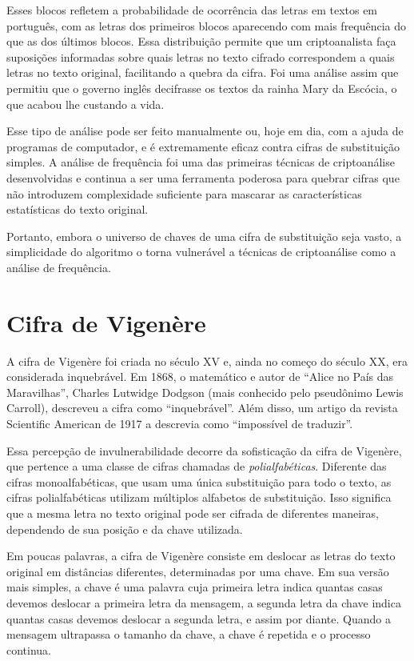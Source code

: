 Esses blocos refletem a probabilidade de ocorrência das letras em textos em português, com as letras dos primeiros blocos aparecendo com mais frequência do que as dos últimos blocos.
Essa distribuição permite que um criptoanalista faça suposições informadas sobre quais letras no texto cifrado correspondem a quais letras no texto original, facilitando a quebra da cifra.
Foi uma análise assim que permitiu que o governo inglês decifrasse os textos da rainha Mary da Escócia, o que acabou lhe custando a vida.

Esse tipo de análise pode ser feito manualmente ou, hoje em dia, com a ajuda de programas de computador, e é extremamente eficaz contra cifras de substituição simples.
A análise de frequência foi uma das primeiras técnicas de criptoanálise desenvolvidas e continua a ser uma ferramenta poderosa para quebrar cifras que não introduzem complexidade suficiente para mascarar as características estatísticas do texto original.

Portanto, embora o universo de chaves de uma cifra de substituição seja vasto, a simplicidade do algoritmo o torna vulnerável a técnicas de criptoanálise como a análise de frequência.

\section{Cifra de Vigenère}
\label{sec:cifra-de-vigenere}

A cifra de Vigenère foi criada no século XV e, ainda no começo do século XX, era considerada inquebrável.
Em 1868, o matemático e autor de ``Alice no País das Maravilhas'', Charles Lutwidge Dodgson (mais conhecido pelo pseudônimo Lewis Carroll), descreveu a cifra como ``inquebrável''.
Além disso, um artigo da revista Scientific American de 1917 a descrevia como ``impossível de traduzir''.

Essa percepção de invulnerabilidade decorre da sofisticação da cifra de Vigenère, que pertence a uma classe de cifras chamadas de {\em polialfabéticas}.
Diferente das cifras monoalfabéticas, que usam uma única substituição para todo o texto, as cifras polialfabéticas utilizam múltiplos alfabetos de substituição.
Isso significa que a mesma letra no texto original pode ser cifrada de diferentes maneiras, dependendo de sua posição e da chave utilizada.

Em poucas palavras, a cifra de Vigenère consiste em deslocar as letras do texto original em distâncias diferentes, determinadas por uma chave.
Em sua versão mais simples, a chave é uma palavra cuja primeira letra indica quantas casas devemos deslocar a primeira letra da mensagem, a segunda letra da chave indica quantas casas devemos deslocar a segunda letra, e assim por diante.
Quando a mensagem ultrapassa o tamanho da chave, a chave é repetida e o processo continua.


